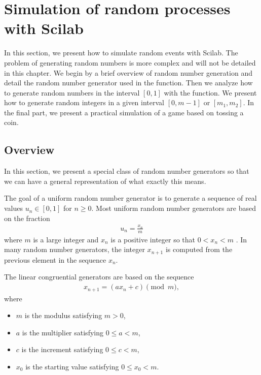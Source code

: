 
\section{Simulation of random processes with Scilab}
\label{introstats-simulation}

In this section, we present how to simulate random 
events with Scilab. The problem of generating 
random numbers is more complex and will not be detailed 
in this chapter. 
We begin by a brief overview of random number 
generation and detail the random number generator used in
the  function. Then we analyze how to generate 
random numbers in the interval $[0,1]$ with the  function. We 
present how to generate random integers in a given interval $[0,m-1]$ or $[m_1,m_2]$.
In the final part, we present a practical simulation of 
a game based on tossing a coin.

\subsection{Overview}

In this section, we present a special class of random
number generators so that we can have a general
representation of what exactly this means.

The goal of a uniform random number generator is to generate
a sequence of real values $u_n\in [0,1]$ for $n\geq 0$.
Most uniform random number generators are based on the 
fraction 
\begin{eqnarray}
u_n = \frac{x_n}{m}
\end{eqnarray}
where $m$ is a large 
integer and $x_n$ is a positive integer so that $0<x_n<m$ .
In many random number generators, the integer $x_{n+1}$ is 
computed from the previous element in the sequence $x_n$.

The linear congruential generators 
\cite{artcomputerKnuthVol2} are based on the sequence
\begin{eqnarray}
x_{n+1} = (a x_n + c) \pmod{m},
\end{eqnarray}
where 
\begin{itemize}
\item $m$ is the modulus satisfying $m>0$,
\item $a$ is the multiplier satisfying $0\leq a <m$,
\item $c$ is the increment satisfying $0\leq c <m$,
\item $x_0$ is the starting value satisfying $0\leq x_0 <m$.
\end{itemize}

